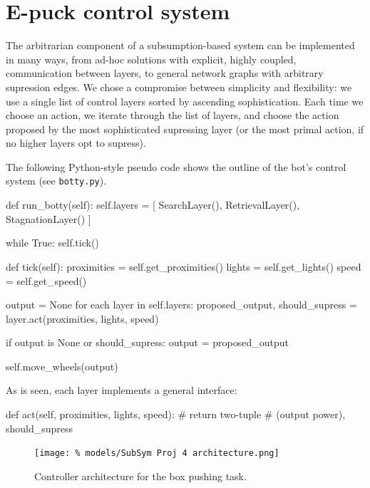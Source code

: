 \documentclass[a4paper,10pt]{article}
\begin{document}
\clearpage

\section{E-puck control system}
\label{sec:a2}

The arbitrarian component of a subsumption-based system can be implemented in
many ways, from ad-hoc solutions with explicit, highly coupled,  communication
between layers, to general network graphs with arbitrary supression edges. We
chose a compromise between simplicity and flexibility: we use a single list of
control layers sorted by ascending sophistication. Each time we choose an
action, we iterate through the list of layers, and choose the action proposed
by the most sophisticated supressing layer (or the most primal action, if no
higher layers opt to supress). 

The following Python-style pseudo code shows the outline of the
bot's control system (see \texttt{botty.py}).

\begin{python}
def run_botty(self):
    self.layers = [
        SearchLayer(),
        RetrievalLayer(),
        StagnationLayer()
    ]

    while True:
        self.tick()

def tick(self):
    proximities = self.get_proximities()
    lights      = self.get_lights()
    speed       = self.get_speed()

    output = None
    for each layer in self.layers:
        proposed_output, should_supress = layer.act(proximities, 
                                                    lights, speed)

        if output is None or should_supress:
            output = proposed_output

    self.move_wheels(output)
\end{python}

As is seen, each layer implements a general interface: 
\begin{python}
def act(self, proximities, lights, speed):
    # return two-tuple 
    # (output power), should_supress
\end{python}


\begin{figure}
  \centering
  \texttt{[image: \%
    models/SubSym Proj 4 architecture.png]}
  \caption{Controller architecture for the box pushing task.}
  \label{fig:architecture}
\end{figure}
\end{document}
